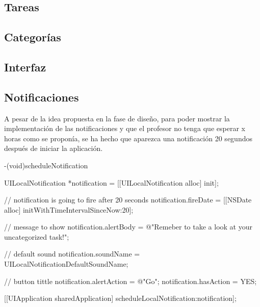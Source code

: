 \documentclass[parskip=half*]{scrartcl}
\begin{document}
\subsection{Tareas}

\subsection{Categor\'ias}

\subsection{Interfaz}

\subsection{Notificaciones}

A pesar de la idea propuesta en la fase de dise\~no, para poder mostrar la implementaci\'on de las notificaciones y que el profesor no tenga que esperar x horas como se propon\'ia, se ha hecho que aparezca una notificaci\'on 20 segundos despu\'es de iniciar la aplicaci\'on.

\begin{verbatimtab}
-(void)scheduleNotification
{
    UILocalNotification *notification = [[UILocalNotification alloc] init];
    
    // notification is going to fire after 20 seconds
    notification.fireDate = [[NSDate alloc] initWithTimeIntervalSinceNow:20];
    
    // message to show
    notification.alertBody = @"Remeber to take a look at your uncategorized task!";
    
    // default sound
    notification.soundName = UILocalNotificationDefaultSoundName;
    
    // button tittle
    notification.alertAction = @"Go";
    notification.hasAction = YES;
    
    [[UIApplication sharedApplication] scheduleLocalNotification:notification];
}
\end{verbatimtab}
\end{document}
